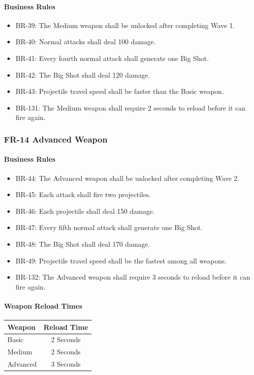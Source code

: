 \documentclass[11pt,a4paper]{article}
\begin{document}
\paragraph{Business Rules}
\begin{itemize}
  \item BR-39: The Medium weapon shall be unlocked after completing Wave 1.
  \item BR-40: Normal attacks shall deal 100 damage.
  \item BR-41: Every fourth normal attack shall generate one Big Shot.
  \item BR-42: The Big Shot shall deal 120 damage.
  \item BR-43: Projectile travel speed shall be faster than the Basic weapon.
  \item BR-131: The Medium weapon shall require 2 seconds to reload before it can
        fire again.
\end{itemize}

\subsubsection{FR-14 Advanced Weapon}

\paragraph{Business Rules}
\begin{itemize}
  \item BR-44: The Advanced weapon shall be unlocked after completing Wave 2.
  \item BR-45: Each attack shall fire two projectiles.
  \item BR-46: Each projectile shall deal 150 damage.
  \item BR-47: Every fifth normal attack shall generate one Big Shot.
  \item BR-48: The Big Shot shall deal 170 damage.
  \item BR-49: Projectile travel speed shall be the fastest among all weapons.
  \item BR-132: The Advanced weapon shall require 3 seconds to reload before it
        can fire again.
\end{itemize}

\paragraph{Weapon Reload Times}
\begin{center}
\begin{tabular}{lc}
  \toprule
  \textbf{Weapon} & \textbf{Reload Time} \\
  \midrule
  Basic    & 2 Seconds \\
  Medium   & 2 Seconds \\
  Advanced & 3 Seconds \\
  \bottomrule
\end{tabular}
\end{center}
\end{document}
